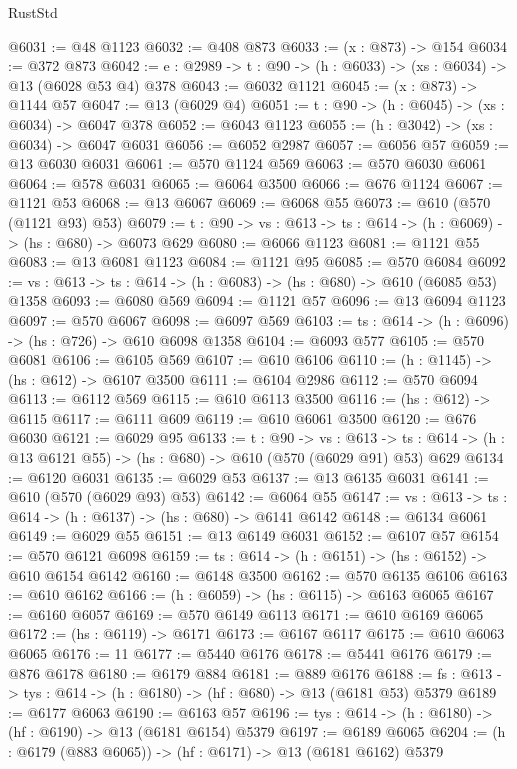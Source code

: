 \begin{lexlean}{RustStd}
\begin{coremodule}
@6031 := @48 @1123
@6032 := @408 @873
@6033 := (x : @873) -> @154
@6034 := @372 @873
@6042 := {e : @2989} -> {t : @90} -> (h : @6033) -> (xs : @6034) -> @13 (@6028 @53 @4) @378
@6043 := @6032 @1121
@6045 := (x : @873) -> @1144 @57
@6047 := @13 (@6029 @4)
@6051 := {t : @90} -> (h : @6045) -> (xs : @6034) -> @6047 @378
@6052 := @6043 @1123
@6055 := (h : @3042) -> (xs : @6034) -> @6047 @6031
@6056 := @6052 @2987
@6057 := @6056 @57
@6059 := @13 @6030 @6031
@6061 := @570 @1124 @569
@6063 := @570 @6030 @6061
@6064 := @578 @6031
@6065 := @6064 @3500
@6066 := @676 @1124
@6067 := @1121 @53
@6068 := @13 @6067
@6069 := @6068 @55
@6073 := @610 (@570 (@1121 @93) @53)
@6079 := {t : @90} -> {vs : @613} -> {ts : @614} -> (h : @6069) -> (hs : @680) -> @6073 @629
@6080 := @6066 @1123
@6081 := @1121 @55
@6083 := @13 @6081 @1123
@6084 := @1121 @95
@6085 := @570 @6084
@6092 := {vs : @613} -> {ts : @614} -> (h : @6083) -> (hs : @680) -> @610 (@6085 @53) @1358
@6093 := @6080 @569
@6094 := @1121 @57
@6096 := @13 @6094 @1123
@6097 := @570 @6067
@6098 := @6097 @569
@6103 := {ts : @614} -> (h : @6096) -> (hs : @726) -> @610 @6098 @1358
@6104 := @6093 @577
@6105 := @570 @6081
@6106 := @6105 @569
@6107 := @610 @6106
@6110 := (h : @1145) -> (hs : @612) -> @6107 @3500
@6111 := @6104 @2986
@6112 := @570 @6094
@6113 := @6112 @569
@6115 := @610 @6113 @3500
@6116 := (hs : @612) -> @6115
@6117 := @6111 @609
@6119 := @610 @6061 @3500
@6120 := @676 @6030
@6121 := @6029 @95
@6133 := {t : @90} ->
  {vs : @613} ->
  {ts : @614} -> (h : @13 @6121 @55) -> (hs : @680) -> @610 (@570 (@6029 @91) @53) @629
@6134 := @6120 @6031
@6135 := @6029 @53
@6137 := @13 @6135 @6031
@6141 := @610 (@570 (@6029 @93) @53)
@6142 := @6064 @55
@6147 := {vs : @613} -> {ts : @614} -> (h : @6137) -> (hs : @680) -> @6141 @6142
@6148 := @6134 @6061
@6149 := @6029 @55
@6151 := @13 @6149 @6031
@6152 := @6107 @57
@6154 := @570 @6121 @6098
@6159 := {ts : @614} -> (h : @6151) -> (hs : @6152) -> @610 @6154 @6142
@6160 := @6148 @3500
@6162 := @570 @6135 @6106
@6163 := @610 @6162
@6166 := (h : @6059) -> (hs : @6115) -> @6163 @6065
@6167 := @6160 @6057
@6169 := @570 @6149 @6113
@6171 := @610 @6169 @6065
@6172 := (hs : @6119) -> @6171
@6173 := @6167 @6117
@6175 := @610 @6063 @6065
@6176 := 11
@6177 := @5440 @6176
@6178 := @5441 @6176
@6179 := @876 @6178
@6180 := @6179 @884
@6181 := @889 @6176
@6188 := {fs : @613} -> {tys : @614} -> (h : @6180) -> (hf : @680) -> @13 (@6181 @53) @5379
@6189 := @6177 @6063
@6190 := @6163 @57
@6196 := {tys : @614} -> (h : @6180) -> (hf : @6190) -> @13 (@6181 @6154) @5379
@6197 := @6189 @6065
@6204 := (h : @6179 (@883 @6065)) -> (hf : @6171) -> @13 (@6181 @6162) @5379

\end{coremodule}
\end{lexlean}
